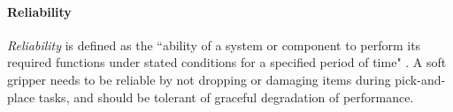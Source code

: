 \documentclass[lettersize,journal]{IEEEtran}
\begin{document}
\paragraph{Reliability}\label{reliability}
\emph{Reliability} is defined as the ``ability of a system or component to perform its required functions under stated conditions for a specified period of time" \cite{ISO24765:2017}. A soft gripper needs to be reliable by not dropping or damaging items during pick-and-place tasks, and should be tolerant of graceful degradation of performance.
\end{document}
